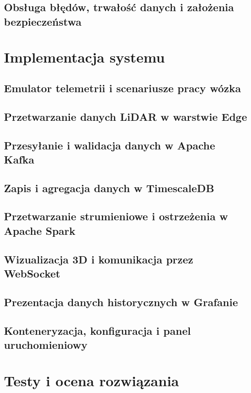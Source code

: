 \documentclass[11pt,a4paper]{report}
\begin{document}
\section{Obsługa błędów, trwałość danych i założenia bezpieczeństwa}

\chapter{Implementacja systemu}
\section{Emulator telemetrii i scenariusze pracy wózka}
\section{Przetwarzanie danych LiDAR w warstwie Edge}
\section{Przesyłanie i walidacja danych w Apache Kafka}
\section{Zapis i agregacja danych w TimescaleDB}
\section{Przetwarzanie strumieniowe i ostrzeżenia w Apache Spark}
\section{Wizualizacja 3D i komunikacja przez WebSocket}
\section{Prezentacja danych historycznych w Grafanie}
\section{Konteneryzacja, konfiguracja i panel uruchomieniowy}

\chapter{Testy i ocena rozwiązania}
\end{document}
